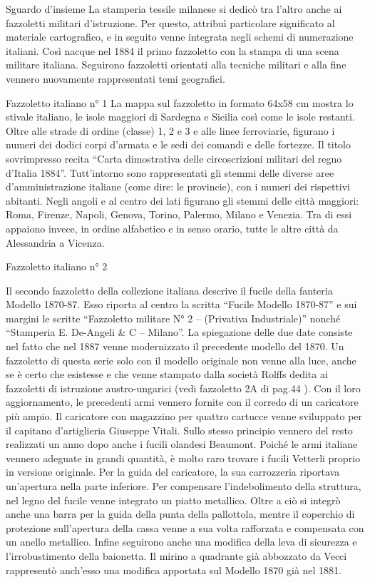 Sguardo d’insieme
   La stamperia tessile milanese si dedicò tra l’altro anche ai fazzoletti militari d’istruzione. Per questo, attribuì particolare significato al materiale cartografico, e in seguito venne integrata negli schemi di numerazione italiani. Così nacque nel 1884 il primo fazzoletto con la stampa di una scena militare italiana. Seguirono fazzoletti orientati alla tecniche militari e alla fine vennero nuovamente rappresentati temi geografici.

Fazzoletto italiano n° 1   
La mappa sul fazzoletto in formato 64x58 cm mostra lo stivale italiano, le isole maggiori di Sardegna e Sicilia così come le isole restanti. Oltre alle strade di ordine (classe) 1, 2 e 3 e alle linee ferroviarie, figurano i numeri dei dodici corpi d’armata e le sedi dei comandi e delle fortezze. 
   Il titolo sovrimpresso recita “Carta dimostrativa delle circoscrizioni militari del regno d’Italia 1884”. Tutt’intorno sono rappresentati gli stemmi delle diverse aree d’amministrazione italiane (come dire: le provincie), con i numeri dei rispettivi  abitanti. Negli angoli e al centro  dei lati figurano gli stemmi delle città maggiori: Roma, Firenze, Napoli, Genova, Torino, Palermo, Milano e Venezia. Tra di essi appaiono invece, in ordine alfabetico e in senso orario, tutte le altre città da Alessandria a Vicenza. 


Fazzoletto italiano n° 2

   Il secondo fazzoletto della collezione italiana descrive il fucile della fanteria Modello 1870-87. Esso riporta al centro la scritta “Fucile Modello 1870-87” e sui margini le scritte “Fazzoletto militare N° 2 – (Privativa Industriale)” nonché “Stamperia E. De-Angeli \& C – Milano”. La spiegazione delle due date consiste nel fatto che nel 1887 venne modernizzato il precedente modello del 1870. Un fazzoletto di questa serie solo con il modello originale non venne alla luce,  anche  se  è  certo che esistesse e che venne stampato dalla società Rolffs dedita ai fazzoletti di istruzione austro-ungarici  (vedi fazzoletto 2A di pag.44 ).
   Con il loro aggiornamento, le precedenti armi vennero fornite con il corredo di un caricatore più ampio. Il caricatore con magazzino per quattro cartucce venne sviluppato per il capitano d’artiglieria Giuseppe Vitali. Sullo stesso principio vennero del resto realizzati un anno dopo anche i fucili olandesi Beaumont. Poiché le armi italiane vennero adeguate in grandi quantità,  è molto raro trovare i fucili Vetterli proprio in versione originale. Per la guida del caricatore, la sua carrozzeria riportava un’apertura nella parte inferiore. Per compensare l’indebolimento della struttura, nel legno del fucile venne integrato un piatto metallico. Oltre a ciò si integrò anche una barra per la guida della punta della pallottola, mentre il coperchio di protezione sull’apertura della cassa venne a sua volta rafforzata e compensata con un anello metallico. 
Infine seguirono anche una modifica della leva di sicurezza e l’irrobustimento della baionetta. Il mirino a quadrante già abbozzato da Vecci rappresentò anch’esso una modifica apportata sul Modello 1870 già nel 1881.

